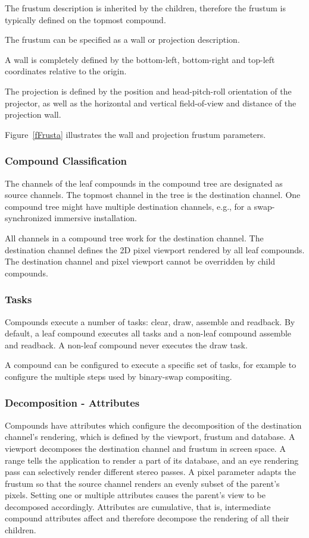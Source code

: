\documentclass[10pt,a4]{scrartcl}
\newcommand{\fig}[1]{Figure~\ref{#1}}
\begin{document}
The frustum description is inherited by the children, therefore the
frustum is typically defined on the topmost compound. 

The frustum can be specified as a wall or projection description. 

A wall is completely defined by the bottom-left, bottom-right and
top-left coordinates relative to the origin. 

The projection is defined by the position and head-pitch-roll
orientation of the projector, as well as the horizontal and vertical
field-of-view and distance of the projection wall. 

\fig{fFrusta} illustrates the wall and projection frustum parameters.

\subsubsection{Compound Classification}
The channels of the leaf compounds in the compound tree are designated
as source channels. The topmost channel in the tree is the destination
channel. One compound tree might have multiple destination channels,
e.g., for a swap-synchronized immersive installation. 

All channels in a compound tree work for the destination channel. The
destination channel defines the 2D pixel viewport rendered by all leaf
compounds. The destination channel and pixel viewport cannot be
overridden by child compounds.

\subsubsection{Tasks}
Compounds execute a number of tasks: clear, draw, assemble and
readback. By default, a leaf compound executes all tasks and a non-leaf
compound assemble and readback. A non-leaf compound never executes the
draw task.

A compound can be configured to execute a specific set of tasks, for
example to configure the multiple steps used by binary-swap compositing.

\subsubsection{Decomposition - Attributes}
Compounds have attributes which configure the decomposition of the
destination channel's rendering, which is defined by the viewport,
frustum and database. A \textsf{viewport} decomposes the destination
channel and frustum in screen space. A \textsf{range} tells the
application to render a part of its database, and an \textsf{eye}
rendering pass can selectively render different stereo passes. A
\textsf{pixel} parameter adapts the frustum so that the source channel
renders an evenly subset of the parent's pixels. Setting one or multiple
attributes causes the parent's view to be decomposed
accordingly. Attributes are cumulative, that is, intermediate compound
attributes affect and therefore decompose the rendering of all their
children.
\end{document}
